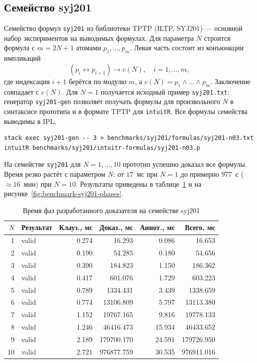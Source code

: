 \documentclass[14pt, russian]{scrartcl}
\begin{document}
\subsection{Семейство syj201}

Семейство формул \texttt{syj201} из библиотеки TPTP (ILTP, SYJ201) --- основной
набор экспериментов на выводимых формулах. Для параметра $N$ строится формула
с $m = 2N + 1$ атомами $p_1, \ldots, p_m$. Левая часть состоит из конъюнкции
импликаций
\[
  (p_i \leftrightarrow p_{i+1}) \rightarrow c(N), \quad i = 1, \ldots, m,
\]
где индексация $i+1$ берётся по модулю $m$, а $c(N) = p_1 \land \ldots \land p_m$.
Заключение совпадает с $c(N)$. Для $N = 1$ получается исходный пример
\texttt{syj201.txt}; генератор \texttt{syj201-gen} позволяет получать формулы
для произвольного $N$ в синтаксисе прототипа и в формате TPTP для
\texttt{intuitR}. Все формулы семейства выводимы в IPL.

\begin{listing}[!htb]
\caption{Генерация семейства syj201 и запуск intuitR}
\label{lst:syj201-gen-intuitr}
\begin{verbatim}
stack exec syj201-gen -- 3 > benchmarks/syj201/formulas/syj201-n03.txt
intuitR benchmarks/syj201/intuitr-formulas/syj201-n03.p
\end{verbatim}
\end{listing}

На семействе \texttt{syj201} для $N = 1, \ldots, 10$ прототип успешно доказал
все формулы. Время резко растёт с параметром $N$: от $17$~мс при $N = 1$ до
примерно $977$~с ($\approx 16$~мин) при $N = 10$. Результаты приведены в
таблице~\ref{tab:benchmark-syj201-family} и на рисунке~\ref{fig:benchmark-syj201-phases}.

\begin{table}[!htb]
\centering
\caption{Время фаз разработанного доказателя на семействе syj201}
\label{tab:benchmark-syj201-family}
\small
\begin{tabular}{|r|l|r|r|r|r|}
\hline
$N$ & Результат & Клауз., мс & Доказ., мс & Аннот., мс & Всего, мс \\
\hline
1 & valid & 0.274 & 16.293 & 0.086 & 16.653 \\
2 & valid & 0.190 & 54.285 & 0.180 & 54.656 \\
3 & valid & 0.390 & 184.823 & 1.150 & 186.362 \\
4 & valid & 0.417 & 601.076 & 1.729 & 603.223 \\
5 & valid & 0.789 & 1334.431 & 3.439 & 1338.659 \\
6 & valid & 0.774 & 13106.809 & 5.797 & 13113.380 \\
7 & valid & 1.152 & 19767.165 & 9.816 & 19778.133 \\
8 & valid & 1.246 & 46416.473 & 15.934 & 46433.652 \\
9 & valid & 2.189 & 179700.170 & 24.591 & 179726.950 \\
10 & valid & 2.721 & 976877.759 & 30.535 & 976911.016 \\
\hline
\end{tabular}
\end{table}
\end{document}
